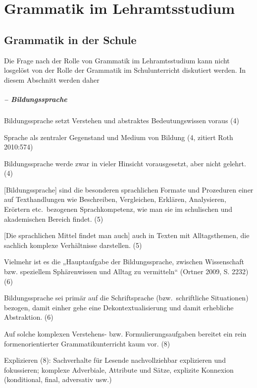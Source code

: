 \chapter{Grammatik im Lehramtsstudium}
\label{sec:grammatikimlehramtsstudium}


\section{Grammatik in der Schule}
\label{sec:grammatikinderschule}

Die Frage nach der Rolle von Grammatik im Lehramtsstudium kann nicht losgelöst von der Rolle der Grammatik im Schulunterricht diskutiert werden.
In diesem Abschnitt werden daher 


\paragraph*{\citet{Feilke2012} -- Bildungssprache}

Bildungssprache setzt Verstehen und abstraktes Bedeutungswissen voraus (4)

Sprache als zentraler Gegenstand und Medium von Bildung (4, zitiert Roth 2010:574)

Bildungssprache werde zwar in vieler Hinsicht vorausgesetzt, aber nicht gelehrt. (4)

[Bildungssprache] sind die besonderen sprachlichen Formate und Prozeduren einer auf Texthandlungen wie Beschreiben, Vergleichen, Erklären, Analysieren, Erörtern etc.\ bezogenen Sprachkompetenz, wie man sie im schulischen und akademischen Bereich findet. (5)

[Die sprachlichen Mittel findet man auch] auch in Texten mit Alltagsthemen, die sachlich komplexe Verhältnisse darstellen. (5)

Vielmehr ist es die „Hauptaufgabe der Bildungssprache, zwischen Wissenschaft bzw. speziellem Sphärenwissen und Alltag zu vermitteln“ (Ortner 2009, S. 2232) (6)

Bildungssprache sei primär auf die Schriftsprache (bzw.\ schriftliche Situationen) bezogen, damit einher gehe eine Dekontextualisierung und damit erhebliche Abstraktion. (6)

Auf solche komplexen Verstehens- bzw. Formulierungsaufgaben bereitet ein rein formenorientierter Grammatikunterricht kaum vor. (8)

Explizieren (8): Sachverhalte für Lesende nachvollziehbar explizieren und fokussieren; komplexe Adverbiale, Attribute und Sätze, explizite Konnexion (konditional, final, adversativ usw.)

